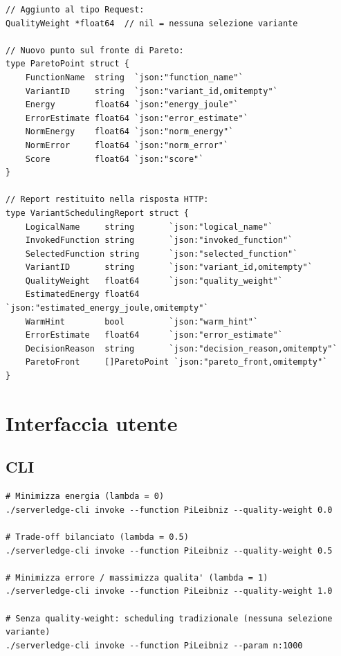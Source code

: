 \documentclass[a4paper,12pt]{article}
\begin{document}
\begin{lstlisting}[style=go, caption={Nuove strutture in \texttt{request.go}}]
// Aggiunto al tipo Request:
QualityWeight *float64  // nil = nessuna selezione variante

// Nuovo punto sul fronte di Pareto:
type ParetoPoint struct {
    FunctionName  string  `json:"function_name"`
    VariantID     string  `json:"variant_id,omitempty"`
    Energy        float64 `json:"energy_joule"`
    ErrorEstimate float64 `json:"error_estimate"`
    NormEnergy    float64 `json:"norm_energy"`
    NormError     float64 `json:"norm_error"`
    Score         float64 `json:"score"`
}

// Report restituito nella risposta HTTP:
type VariantSchedulingReport struct {
    LogicalName     string       `json:"logical_name"`
    InvokedFunction string       `json:"invoked_function"`
    SelectedFunction string      `json:"selected_function"`
    VariantID       string       `json:"variant_id,omitempty"`
    QualityWeight   float64      `json:"quality_weight"`
    EstimatedEnergy float64      `json:"estimated_energy_joule,omitempty"`
    WarmHint        bool         `json:"warm_hint"`
    ErrorEstimate   float64      `json:"error_estimate"`
    DecisionReason  string       `json:"decision_reason,omitempty"`
    ParetoFront     []ParetoPoint `json:"pareto_front,omitempty"`
}
\end{lstlisting}

\section{Interfaccia utente}

\subsection{CLI}

\begin{lstlisting}[style=bash, caption={Invocazione tramite CLI}]
# Minimizza energia (lambda = 0)
./serverledge-cli invoke --function PiLeibniz --quality-weight 0.0

# Trade-off bilanciato (lambda = 0.5)
./serverledge-cli invoke --function PiLeibniz --quality-weight 0.5

# Minimizza errore / massimizza qualita' (lambda = 1)
./serverledge-cli invoke --function PiLeibniz --quality-weight 1.0

# Senza quality-weight: scheduling tradizionale (nessuna selezione variante)
./serverledge-cli invoke --function PiLeibniz --param n:1000
\end{lstlisting}
\end{document}

